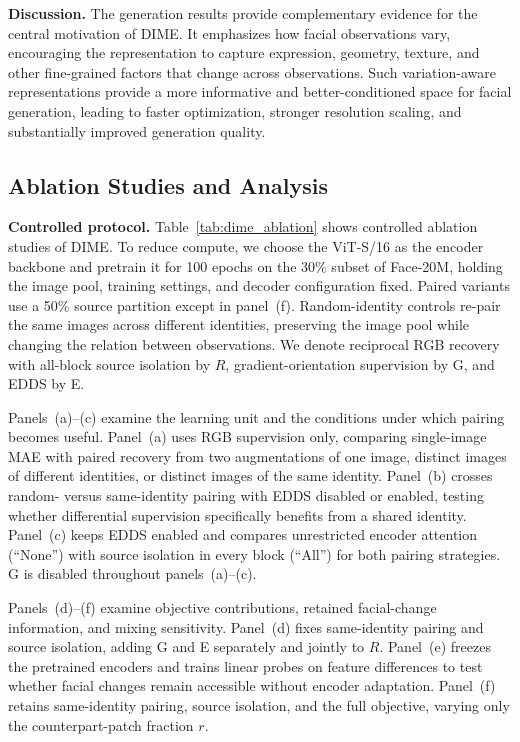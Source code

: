 \documentclass[10pt,journal,compsoc]{IEEEtran}
\begin{document}
\noindent\textbf{Discussion.} The generation results provide complementary evidence for the central motivation of DIME. It emphasizes how facial observations vary, encouraging the representation to capture expression, geometry, texture, and other fine-grained factors that change across observations. Such variation-aware representations provide a more informative and better-conditioned space for facial generation, leading to faster optimization, stronger resolution scaling, and substantially improved generation quality.


\subsection{Ablation Studies and Analysis}
\label{sec:exp_ablation}

\noindent\textbf{Controlled protocol.}
Table~\ref{tab:dime_ablation} shows controlled ablation studies of DIME. To reduce compute, we choose the ViT-S/16 as the encoder backbone and pretrain it for 100 epochs on the 30\% subset of Face-20M, holding the image pool, training settings, and decoder configuration fixed. Paired variants use a 50\% source partition except in panel~(f). Random-identity controls re-pair the same images across different identities, preserving the image pool while changing the relation between observations. We denote reciprocal RGB recovery with all-block source isolation by $R$, gradient-orientation supervision by G, and EDDS by E.

Panels~(a)--(c) examine the learning unit and the conditions under which pairing becomes useful. Panel~(a) uses RGB supervision only, comparing single-image MAE with paired recovery from two augmentations of one image, distinct images of different identities, or distinct images of the same identity. Panel~(b) crosses random- versus same-identity pairing with EDDS disabled or enabled, testing whether differential supervision specifically benefits from a shared identity. Panel~(c) keeps EDDS enabled and compares unrestricted encoder attention (``None'') with source isolation in every block (``All'') for both pairing strategies. G is disabled throughout panels~(a)--(c).

Panels~(d)--(f) examine objective contributions, retained facial-change information, and mixing sensitivity. Panel~(d) fixes same-identity pairing and source isolation, adding G and E separately and jointly to $R$. Panel~(e) freezes the pretrained encoders and trains linear probes on feature differences to test whether facial changes remain accessible without encoder adaptation. Panel~(f) retains same-identity pairing, source isolation, and the full objective, varying only the counterpart-patch fraction $r$.
\end{document}
